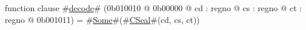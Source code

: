 function clause #\hyperref[zdecode]{decode}# (0b010010 @ 0b00000 @ cd : regno @ cs : regno @ ct : regno @ 0b001011) = #\hyperref[zSome]{Some}#(#\hyperref[zCSeal]{CSeal}#(cd, cs, ct))
